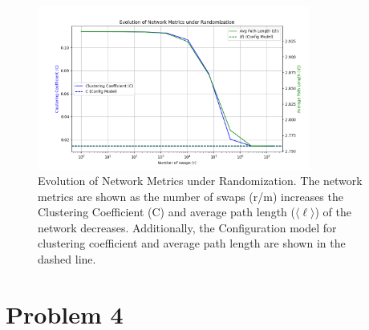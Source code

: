 \documentclass[12pt]{article}
\begin{document}
\begin{figure}[h]
    \centering
    \includegraphics[width=0.8\textwidth]{../figures/network_evolution.png}
    \caption{Evolution of Network Metrics under Randomization. The network metrics are shown as the number of swaps (r/m) increases the Clustering Coefficient (C) and average path length ($\langle \ell \rangle$) of the network decreases. Additionally, the Configuration model for clustering coefficient and average path length are shown in the dashed line.}
    \label{fig:network_evolution}
\end{figure}

\section*{Problem 4}
\end{document}
